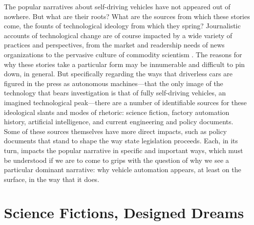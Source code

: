 The popular narratives about self-driving vehicles have not appeared
out of nowhere. But what are their roots? What are the sources from which
these stories come, the founts of technological ideology from which
they spring? Journalistic accounts of technological change are of
course impacted by a wide variety of practices and perspectives, from
the market and readership needs of news organizations to the pervasive
culture of commodity scientism \cite{smithSelling}. The
reasons for why these stories take a particular form may be innumerable
and difficult to pin down, in general. But specifically regarding the ways that
driverless cars are figured in the press as autonomous
machines---that the only image of the technology that bears
investigation is that of fully self-driving vehicles, an imagined
technological peak---there
are a number of identifiable sources for these ideological slants and
modes of rhetoric: science fiction, factory automation history,
artificial intelligence, and current engineering and policy documents. Some of
these sources themselves have more direct impacts, such as
policy documents that stand to shape the way state legislation proceeds. Each,
in its turn, impacts the popular narrative in specific and important
ways, which must be understood if we are to come to grips with the
question of why we see a particular dominant narrative:  why vehicle
automation appears, at least on the surface, in the way that it does.

\section{Science Fictions, Designed Dreams}

